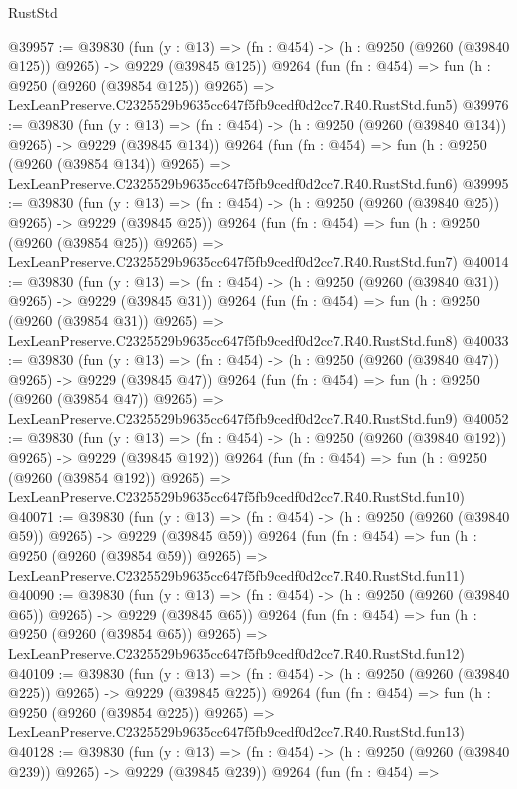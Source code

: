 \begin{lexlean}{RustStd}
\begin{coremodule}
@39957 := @39830
    (fun (y : @13) => (fn : @454) -> (h : @9250 (@9260 (@39840 @125)) @9265) -> @9229 (@39845 @125))
    @9264
    (fun (fn : @454) =>
    fun (h : @9250 (@9260 (@39854 @125)) @9265) =>
    LexLeanPreserve.C2325529b9635cc647f5fb9cedf0d2cc7.R40.RustStd.fun5)
@39976 := @39830
    (fun (y : @13) => (fn : @454) -> (h : @9250 (@9260 (@39840 @134)) @9265) -> @9229 (@39845 @134))
    @9264
    (fun (fn : @454) =>
    fun (h : @9250 (@9260 (@39854 @134)) @9265) =>
    LexLeanPreserve.C2325529b9635cc647f5fb9cedf0d2cc7.R40.RustStd.fun6)
@39995 := @39830
    (fun (y : @13) => (fn : @454) -> (h : @9250 (@9260 (@39840 @25)) @9265) -> @9229 (@39845 @25))
    @9264
    (fun (fn : @454) =>
    fun (h : @9250 (@9260 (@39854 @25)) @9265) =>
    LexLeanPreserve.C2325529b9635cc647f5fb9cedf0d2cc7.R40.RustStd.fun7)
@40014 := @39830
    (fun (y : @13) => (fn : @454) -> (h : @9250 (@9260 (@39840 @31)) @9265) -> @9229 (@39845 @31))
    @9264
    (fun (fn : @454) =>
    fun (h : @9250 (@9260 (@39854 @31)) @9265) =>
    LexLeanPreserve.C2325529b9635cc647f5fb9cedf0d2cc7.R40.RustStd.fun8)
@40033 := @39830
    (fun (y : @13) => (fn : @454) -> (h : @9250 (@9260 (@39840 @47)) @9265) -> @9229 (@39845 @47))
    @9264
    (fun (fn : @454) =>
    fun (h : @9250 (@9260 (@39854 @47)) @9265) =>
    LexLeanPreserve.C2325529b9635cc647f5fb9cedf0d2cc7.R40.RustStd.fun9)
@40052 := @39830
    (fun (y : @13) => (fn : @454) -> (h : @9250 (@9260 (@39840 @192)) @9265) -> @9229 (@39845 @192))
    @9264
    (fun (fn : @454) =>
    fun (h : @9250 (@9260 (@39854 @192)) @9265) =>
    LexLeanPreserve.C2325529b9635cc647f5fb9cedf0d2cc7.R40.RustStd.fun10)
@40071 := @39830
    (fun (y : @13) => (fn : @454) -> (h : @9250 (@9260 (@39840 @59)) @9265) -> @9229 (@39845 @59))
    @9264
    (fun (fn : @454) =>
    fun (h : @9250 (@9260 (@39854 @59)) @9265) =>
    LexLeanPreserve.C2325529b9635cc647f5fb9cedf0d2cc7.R40.RustStd.fun11)
@40090 := @39830
    (fun (y : @13) => (fn : @454) -> (h : @9250 (@9260 (@39840 @65)) @9265) -> @9229 (@39845 @65))
    @9264
    (fun (fn : @454) =>
    fun (h : @9250 (@9260 (@39854 @65)) @9265) =>
    LexLeanPreserve.C2325529b9635cc647f5fb9cedf0d2cc7.R40.RustStd.fun12)
@40109 := @39830
    (fun (y : @13) => (fn : @454) -> (h : @9250 (@9260 (@39840 @225)) @9265) -> @9229 (@39845 @225))
    @9264
    (fun (fn : @454) =>
    fun (h : @9250 (@9260 (@39854 @225)) @9265) =>
    LexLeanPreserve.C2325529b9635cc647f5fb9cedf0d2cc7.R40.RustStd.fun13)
@40128 := @39830
    (fun (y : @13) => (fn : @454) -> (h : @9250 (@9260 (@39840 @239)) @9265) -> @9229 (@39845 @239))
    @9264
    (fun (fn : @454) =>

\end{coremodule}
\end{lexlean}
